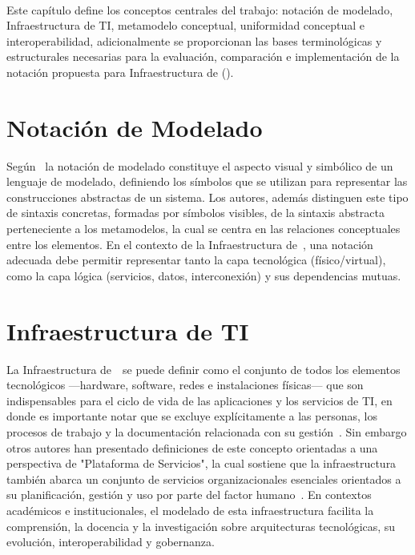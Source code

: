 \label{cap:marcoConceptual}
\mbox{}\\

\noindent
Este capítulo define los conceptos centrales del trabajo: notación de modelado, Infraestructura de TI, metamodelo conceptual, uniformidad conceptual e interoperabilidad, adicionalmente se proporcionan las bases terminológicas y estructurales necesarias para la evaluación, comparación e implementación de la notación propuesta para Infraestructura de \TI (\NDITI).

\noindent
\section{Notación de Modelado}
\noindent
Según~\cite{Fettke01} la notación de modelado constituye el aspecto visual y simbólico de un lenguaje de modelado, definiendo los símbolos que se utilizan para representar las construcciones abstractas de un sistema. Los autores, además distinguen este tipo de sintaxis concretas, formadas por símbolos visibles, de la sintaxis abstracta perteneciente a los metamodelos, la cual se centra en las relaciones conceptuales entre los elementos. En el contexto de la Infraestructura de~\TI{}, una notación adecuada debe permitir representar tanto la capa tecnológica (físico/virtual), como la capa lógica (servicios, datos, interconexión) y sus dependencias mutuas.

\section{Infraestructura de TI}
\noindent
La Infraestructura de~\TI~se puede definir como el conjunto de todos los elementos tecnológicos ---hardware, software,  redes e instalaciones físicas--- que son indispensables para el ciclo de vida de las aplicaciones y los servicios de TI, en donde es importante notar que se excluye explícitamente a las personas, los procesos de trabajo y la documentación relacionada con su gestión~\citep{Axelos01}. Sin embargo otros autores han presentado definiciones de este concepto orientadas a una perspectiva de "Plataforma de Servicios", la cual sostiene que la infraestructura también abarca un conjunto de servicios organizacionales esenciales orientados a su planificación, gestión y uso por parte del factor humano~\citep{Laudon01}. En contextos académicos e institucionales, el modelado de esta infraestructura facilita la comprensión, la docencia y la investigación sobre arquitecturas tecnológicas, su evolución, interoperabilidad y gobernanza.

